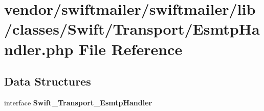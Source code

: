 \section{vendor/swiftmailer/swiftmailer/lib/classes/\+Swift/\+Transport/\+Esmtp\+Handler.php File Reference}
\label{_esmtp_handler_8php}
\subsection*{Data Structures}
\begin{DoxyCompactItemize}
\item 
interface {\bf Swift\+\_\+\+Transport\+\_\+\+Esmtp\+Handler}
\end{DoxyCompactItemize}
